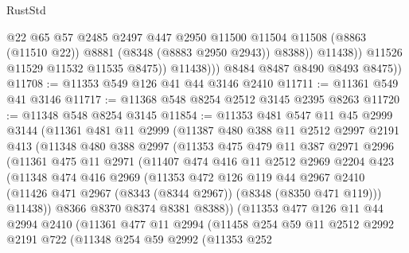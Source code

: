 \begin{lexlean}{RustStd}
\begin{coremodule}
{\begin{coremodule}
{{{{{{{{{{{{{{{{{{{{{{{{{{{{{{{{{{{{{{{{{{{{{{{{{{                          @22
                          @65
                          @57
                          @2485
                          @2497
                          @447
                          @2950
                          @11500
                          @11504
                          @11508
                          (@8863 (@11510 @22))
                          @8881
                          (@8348 (@8883 @2950 @2943))
                          @8388))
                      @11438))
                  @11526
                  @11529
                  @11532
                  @11535
                  @8475))
              @11438)))
        @8484
        @8487
        @8490
        @8493
        @8475))
@11708 := @11353 @549 @126 @41 @44 @3146 @2410
@11711 := @11361 @549 @41 @3146
@11717 := @11368 @548 @8254 @2512 @3145 @2395 @8263
@11720 := @11348 @548 @8254 @3145
@11854 := @11353
    @481
    @547
    @11
    @45
    @2999
    @3144
    (@11361
      @481
      @11
      @2999
      (@11387
        @480
        @388
        @11
        @2512
        @2997
        @2191
        @413
        (@11348
          @480
          @388
          @2997
          (@11353
            @475
            @479
            @11
            @387
            @2971
            @2996
            (@11361
              @475
              @11
              @2971
              (@11407
                @474
                @416
                @11
                @2512
                @2969
                @2204
                @423
                (@11348
                  @474
                  @416
                  @2969
                  (@11353
                    @472
                    @126
                    @119
                    @44
                    @2967
                    @2410
                    (@11426 @471 @2967 (@8343 (@8344 @2967)) (@8348 (@8350 @471 @119)))
                    @11438))
                @8366
                @8370
                @8374
                @8381
                @8388))
            (@11353
              @477
              @126
              @11
              @44
              @2994
              @2410
              (@11361
                @477
                @11
                @2994
                (@11458
                  @254
                  @59
                  @11
                  @2512
                  @2992
                  @2191
                  @722
                  (@11348
                    @254
                    @59
                    @2992
                    (@11353
                      @252
}}}}}}}}}}}}}}}}}}}}}}}}}}}}}}}}}}}}}}}}}}}}}}}}}}
\end{coremodule}}
\end{coremodule}
\end{lexlean}
